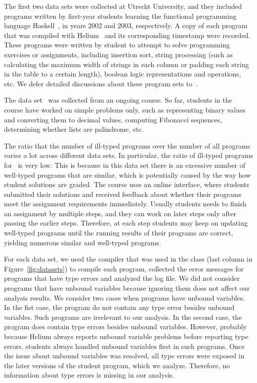 \documentclass[12pt]{report}	%
\begin{document}
The first two data sets were collected at Utrecht University,
and they included programs written
by first-year students learning the functional programming
language Haskell~\cite{jones2003haskell}, in years 2002 and 2003,
respectively. A copy of each program that
was compiled with Helium~\cite{Heeren03:HLH} and its
corresponding timestamp were recorded. These programs were written by
student to attempt to solve programming exercises or assignments, including
insertion sort,
string processing (such as calculating the maximum width of
strings in each column or padding each string in the table to
a certain length), boolean logic representations and operations, etc.
We defer detailed discussions about these program
sets to~\cite{Keeken06:AHP,Hage09:Neon}.

The data set \benchl\ was collected from an ongoing course. So far,
students in the course have worked on simple problems only, such as
representing binary values and converting them to decimal values,
computing Fibonacci sequences, determining whether lists are palindrome,
etc.

The ratio that the number of ill-typed programs
over the number of all programs
varies a lot across different data sets. In particular,
the ratio of ill-typed programs
for \benchl\ is very low. 
This is because in this data set there is an
excessive number of well-typed programs that are similar,
which is potentially caused by 
the way how student
solutions are graded. The course uses an online
interface, where students submitted their solutions and received
feedback about whether their programs meet the assignment requirements immediately.
Usually students needs to finish an assignment by multiple steps,
and they can work on later steps only after passing the earlier steps.
Therefore, at each step students may keep on updating well-typed programs
until the running results of their programs are correct, yielding numerous
similar and well-typed programs.

For each data set, we used the compiler that was used in the class (last column in Figure~\ref{fig:datasets})
%
to compile each program,
collected the error messages for programs that have type
errors 
and analyzed the log file.
We did not consider programs that have unbound variables
because ignoring them does not affect our analysis results. 
We consider two cases when programs have unbound variables. 
In the fist case, 
%
the program do not contain any type error besides 
unbound variables. Such programs are irrelevant to 
our analysis. In the second case, the program does
contain type errors besides unbound variables. 
%
However, probably because Helium always reports 
unbound variable problems before reporting
type errors, students
always handled unbound variables first in such 
programs. Once the issue about unbound variables
was resolved, all type errors were exposed 
in the later versions of the student program, which we analyze.
Therefore, no information about type errors is missing
in our analysis. 
\end{document}
